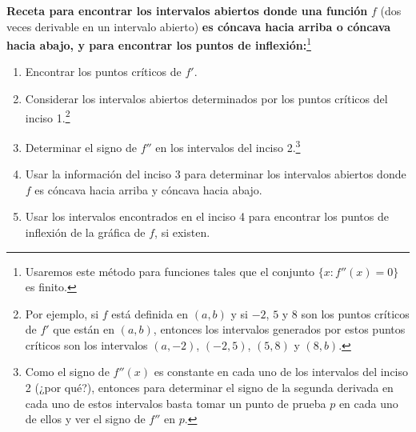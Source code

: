 \documentclass[12pt,a4paper]{book}
\newcommand{\receta}[1]{\par\addvspace{\medskipamount}#1\par\nobreak}
\begin{document}
    \receta{\textbf{Receta para encontrar los intervalos abiertos donde una función} \normalfont$f$ (dos veces derivable en un intervalo abierto) \textbf{es cóncava hacia arriba o cóncava hacia abajo, y para encontrar los puntos de inflexión:}\footnote{Usaremos este método para funciones tales que el conjunto $\{x:f''(x)=0\}$ es finito.}}
    \begin{enumerate}[label=\arabic*.,nosep]
        \item Encontrar los puntos críticos de $f'$.
        \item Considerar los intervalos abiertos determinados por los puntos críticos del
        inciso 1.\footnote{Por ejemplo, si $f$ está definida en $(a,b)$ y si $-2$, $5$ y $8$ son los puntos críticos de $f'$ que
        están en $(a,b)$, entonces los intervalos generados por estos puntos críticos son los intervalos
        $(a,-2)$, $(-2,5)$, $(5,8)$ y $(8,b)$.}
        \item Determinar el signo de $f''$ en los intervalos del inciso 2.\footnote{Como el signo de $f''(x)$ es constante en cada uno de los intervalos del inciso 2 (¿por
        qué?), entonces para determinar el signo de la segunda derivada en cada uno de estos
        intervalos basta tomar un punto de prueba $p$ en cada uno de ellos y ver el signo de $f''$ en
        $p$.}
        \item Usar la información del inciso 3 para determinar los intervalos abiertos
        donde $f$ es cóncava hacia arriba y cóncava hacia abajo.
        \item Usar los intervalos encontrados en el inciso 4 para encontrar los puntos de
        inflexión de la gráfica de $f$, si existen.
    \end{enumerate}
\end{document}
